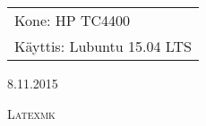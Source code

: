 \documentclass[a4paper, 12pt, twoside]{artikel3}
\begin{document}
\thispagestyle{empty}
\begin{tabular}[t]{l}
Kone: HP TC4400\\
Käyttis: Lubuntu 15.04 LTS
\end{tabular}
\hfill 8.11.2015

{\scshape\Large{Latexmk}}
\end{document}
